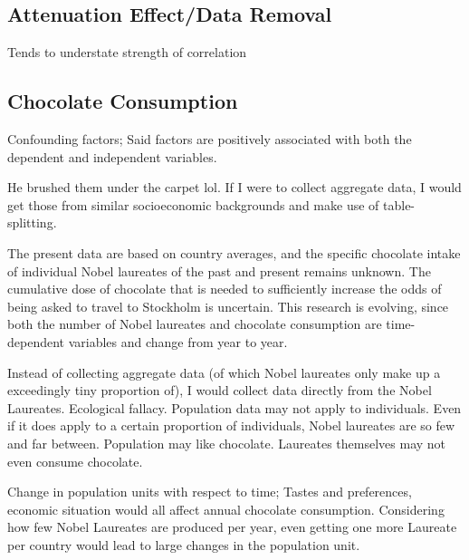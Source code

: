 \documentclass{article}
\begin{document}
\subsection{Attenuation Effect/Data Removal}
Tends to understate strength of correlation

\subsection{Chocolate Consumption}
Confounding factors; Said factors are positively associated with both the dependent and independent variables.

He brushed them under the carpet lol.
If I were to collect aggregate data, I would get those from similar socioeconomic backgrounds and make use of table-splitting.

The present data are based on country averages,
and the specific chocolate intake of individual
Nobel laureates of the past and present remains
unknown. The cumulative dose of chocolate that
is needed to sufficiently increase the odds of being asked to travel to Stockholm is uncertain.
This research is evolving, since both the number
of Nobel laureates and chocolate consumption
are time-dependent variables and change from
year to year.

Instead of collecting aggregate data (of which Nobel laureates only make up a exceedingly tiny proportion of), I would collect data directly from the Nobel Laureates. Ecological fallacy. Population data may not apply to individuals. Even if it does apply to a certain proportion of individuals, Nobel laureates are so few and far between.
Population may like chocolate. Laureates themselves may not even consume chocolate.

Change in population units with respect to time; Tastes and preferences, economic situation would all affect annual chocolate consumption. Considering how few Nobel Laureates are produced per year, even getting one more Laureate per country would lead to large changes in the population unit. 
\end{document}
